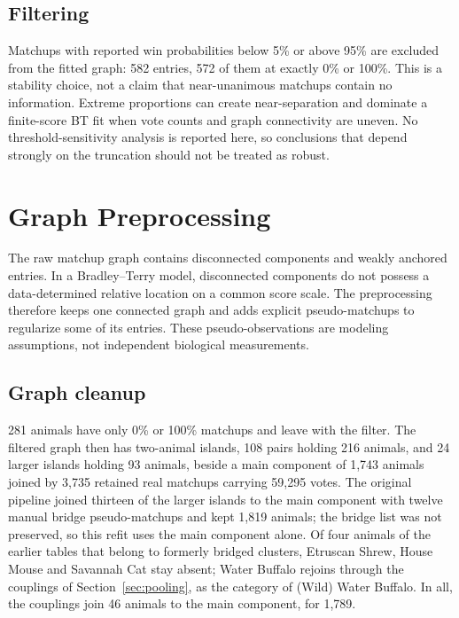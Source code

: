 \documentclass[11pt]{article}
\begin{document}
\subsection{Filtering}
Matchups with reported win probabilities below 5\% or above 95\% are excluded from the fitted graph: 582 entries, 572 of them at exactly 0\% or 100\%. This is a stability choice, not a claim that near-unanimous matchups contain no information. Extreme proportions can create near-separation and dominate a finite-score BT fit when vote counts and graph connectivity are uneven. No threshold-sensitivity analysis is reported here, so conclusions that depend strongly on the truncation should not be treated as robust.

\section{Graph Preprocessing}
\label{sec:preprocess}

The raw matchup graph contains disconnected components and weakly anchored entries. In a Bradley--Terry model, disconnected components do not possess a data-determined relative location on a common score scale. The preprocessing therefore keeps one connected graph and adds explicit pseudo-matchups to regularize some of its entries. These pseudo-observations are modeling assumptions, not independent biological measurements.

\subsection{Graph cleanup}
281 animals have only 0\% or 100\% matchups and leave with the filter. The filtered graph then has two-animal islands, 108 pairs holding 216 animals, and 24 larger islands holding 93 animals, beside a main component of 1,743 animals joined by 3,735 retained real matchups carrying 59,295 votes. The original pipeline joined thirteen of the larger islands to the main component with twelve manual bridge pseudo-matchups and kept 1,819 animals; the bridge list was not preserved, so this refit uses the main component alone. Of four animals of the earlier tables that belong to formerly bridged clusters, Etruscan Shrew, House Mouse and Savannah Cat stay absent; Water Buffalo rejoins through the couplings of Section~\ref{sec:pooling}, as the category of (Wild) Water Buffalo. In all, the couplings join 46 animals to the main component, for 1,789.
\end{document}
